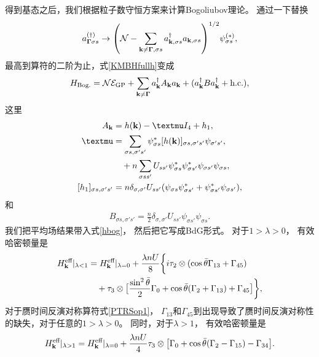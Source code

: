 得到基态之后，我们根据粒子数守恒方案来计算Bogoliubov理论\cite{Kawaguchi2012}。
通过一下替换
\begin{equation}
	a^{(\dagger)}_{\boldsymbol{\Gamma}\sigma s} \rightarrow  \pqty{\mathcal N-\sum_{\vb k\neq\boldsymbol{\Gamma},\sigma s}a^\dagger_{\vb k,\sigma s}a_{\vb k,\sigma s}}^{1/2}\psi^{(*)}_{\sigma s},\nonumber
\end{equation}
最高到算符的二阶为止，式\eqref{KMBHfullh}变成
\begin{equation}\label{hbog}
	H_{\textnormal{Bog.}}=\mathcal N\mathcal E_{\textnormal{GP}} + \sum_{\vb k\neq \boldsymbol{\Gamma}} a^\dagger_{\vb k}A_{\vb k} a_{\vb k} + (a^\dagger_{\vb k} B a^\dagger_{\vb k}+{\text{h.c.}}),
\end{equation}
这里
\begin{align}
	A_{\vb k} & = h(\vb k) - \mu I_4 + h_1,\\
	\mu & = \sum_{\sigma s,\sigma' s'} \psi_{\sigma s}^* [h(\vb k)]_{\sigma s,\sigma' s'} \psi_{\sigma' s'},\\
	&\quad + n\sum_{\sigma s s'}U_{ss'}\psi^*_{\sigma s}\psi_{\sigma s'}^*\psi_{\sigma s'}\psi_{\sigma s},\\
	[h_1]_{\sigma s,\sigma' s'} & = n\delta_{\sigma,\sigma'}U_{s s'}(\psi_{\sigma s} \psi^*_{\sigma s'}+\psi^*_{\sigma s'}\psi_{\sigma s'}),
\end{align}
和
\begin{align}
	B_{\sigma s,\sigma' s'} = \frac{n}{2}\delta_{\sigma,\sigma'} U_{ss'} \psi_{\sigma s'}\psi_{\sigma s}.
\end{align}
我们把平均场结果带入式\eqref{hbog}，
然后把它写成BdG形式。
对于$1>\lambda>0$，
有效哈密顿量是
\begin{equation}\label{KMBHheefl1}
	\begin{split}
	H^{\text{eff}}_{\vb k}\vert_{\lambda<1} &= H^{\text{eff}}_{\vb k}\vert_{\lambda=0} + \frac{\lambda nU}{8}\bigg\{i\tau_2\otimes(\cos\bar\theta \Gamma_{13}+\Gamma_{45})\\
	&\quad + \tau_3\otimes \big[\frac{\sin^2\bar\theta}{2} \Gamma_0 + \cos\bar\theta (\Gamma_2 + \Gamma_{13}) +\Gamma_{45}\big]\bigg\},
	\end{split}
\end{equation}
对于赝时间反演对称算符式\eqref{PTRSop1}，
$\Gamma_{13}$和$\Gamma_{45}$到出现导致了赝时间反演对称性的缺失，对于任意的$1>\lambda>0$。
同时，对于$\lambda>1$，
有效哈密顿量是
\begin{equation}\label{KMBHheefg1}
	H^{\text{eff}}_{\vb k}\vert_{\lambda>1} = H^{\text{eff}}_{\vb k}\vert_{\lambda=0} + \frac{\lambda n U}{4}\tau_3\otimes \big[ \Gamma_0 + \cos\bar\theta (\Gamma_2 - \Gamma_{15}) - \Gamma_{34} \big].
\end{equation}
